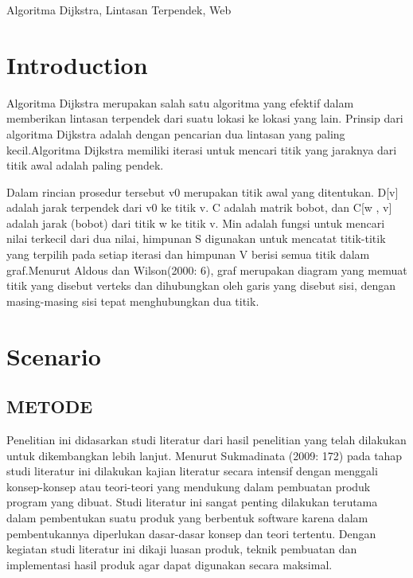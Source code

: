 \documentclass[conference]{IEEEtran}
\begin{document}
\begin{IEEEkeywords}
    Algoritma Dijkstra, Lintasan Terpendek, Web
\end{IEEEkeywords}

\section{Introduction}
Algoritma Dijkstra merupakan salah satu algoritma yang efektif dalam memberikan
lintasan terpendek dari suatu lokasi ke lokasi yang lain. Prinsip dari algoritma Dijkstra adalah
dengan pencarian dua lintasan yang paling kecil.Algoritma Dijkstra memiliki iterasi untuk
mencari titik yang jaraknya dari titik awal adalah paling pendek.

Dalam rincian prosedur tersebut v0 merupakan titik awal yang ditentukan. D[v] adalah
jarak terpendek dari v0 ke titik v. C adalah matrik bobot, dan C[w , v] adalah jarak (bobot) dari
titik w ke titik v. Min adalah fungsi untuk mencari nilai terkecil dari dua nilai, himpunan S
digunakan untuk mencatat titik-titik yang terpilih pada setiap iterasi dan himpunan V berisi
semua titik dalam graf.Menurut Aldous dan Wilson(2000: 6), graf merupakan diagram yang
memuat titik yang disebut verteks dan dihubungkan oleh garis yang disebut sisi, dengan
masing-masing sisi tepat menghubungkan dua titik. 

\section{Scenario}
\subsection{METODE}
Penelitian ini didasarkan studi literatur dari hasil penelitian yang telah dilakukan
untuk dikembangkan lebih lanjut. Menurut Sukmadinata (2009: 172) pada tahap studi literatur
ini dilakukan kajian literatur secara intensif dengan menggali konsep-konsep atau teori-teori
yang mendukung dalam pembuatan produk program yang dibuat. Studi literatur ini sangat
penting dilakukan terutama dalam pembentukan suatu produk yang berbentuk software karena
dalam pembentukannya diperlukan dasar-dasar konsep dan teori tertentu. Dengan kegiatan
studi literatur ini dikaji luasan produk, teknik pembuatan dan implementasi hasil produk agar
dapat digunakan secara maksimal. 
\end{document}
